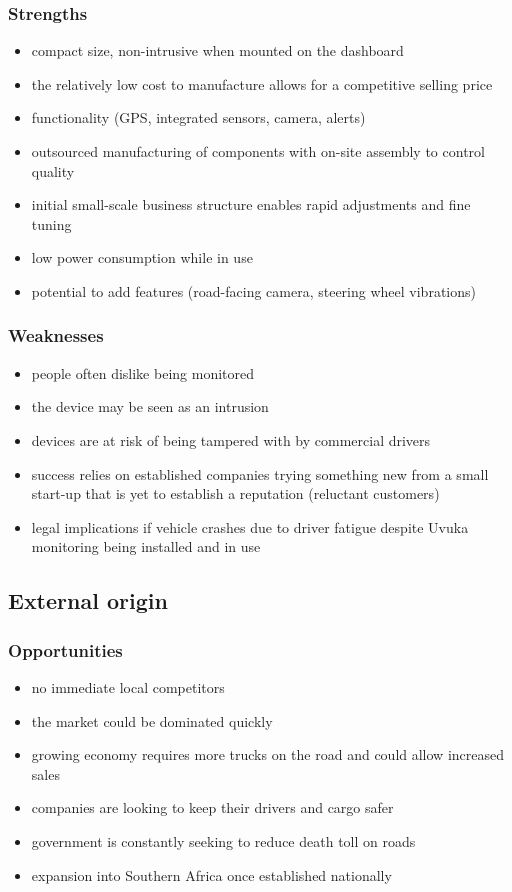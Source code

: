 \subsubsection{Strengths}
\vskip8pt
\begin{itemize}
\item compact size, non-intrusive when mounted on the dashboard
\item the relatively low cost to manufacture allows for a competitive selling price
\item functionality (GPS, integrated sensors, camera, alerts)
\item outsourced manufacturing of components with on-site assembly to control quality
\item initial small-scale business structure enables rapid adjustments and fine tuning
\item low power consumption while in use
\item potential to add features (road-facing camera, steering wheel vibrations)
\end{itemize}
\vskip15pt
\subsubsection{Weaknesses}
\vskip8pt
\begin{itemize}
\item people often dislike being monitored
\item the device may be seen as an intrusion
\item devices are at risk of being tampered with by commercial drivers
\item success relies on established companies trying something new from a small start-up that is yet to establish a reputation (reluctant customers)
\item legal implications if vehicle crashes due to driver fatigue despite Uvuka monitoring being installed and in use
\end{itemize}
\vskip15pt
\subsection{External origin}
\subsubsection{Opportunities}
\vskip8pt
\begin{itemize}
\item no immediate local competitors
\item the market could be dominated quickly
\item growing economy requires more trucks on the road and could allow increased sales
\item companies are looking to keep their drivers and cargo safer
\item government is constantly seeking to reduce death toll on roads
\item expansion into Southern Africa once established nationally
\end{itemize}

